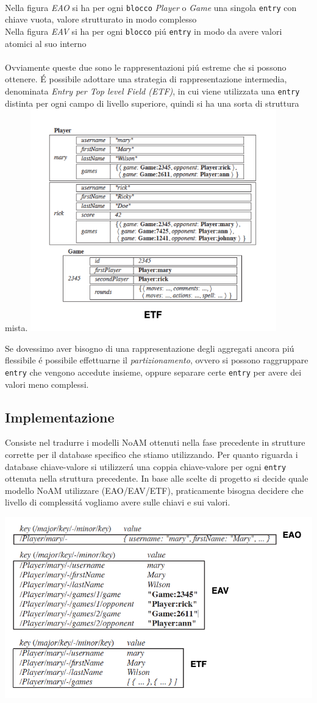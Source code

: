 \\
Nella figura \emph{EAO} si ha per ogni \texttt{blocco} \emph{Player} o \emph{Game} una singola \texttt{entry} con chiave vuota,
valore strutturato in modo complesso
\\
Nella figura \emph{EAV} si ha per ogni \texttt{blocco} piú \texttt{entry} in modo da avere valori atomici al suo interno
\\
\\
Ovviamente queste due sono le rappresentazioni piú estreme che si possono ottenere.
É possibile adottare una strategia di rappresentazione intermedia, denominata \emph{Entry per Top level Field (ETF)}, in cui
viene utilizzata una \texttt{entry} distinta per ogni campo di livello superiore, quindi si ha una sorta di struttura mista.
\includegraphics[width=0.8\textwidth]{img/etf}

Se dovessimo aver bisogno di una rappresentazione degli aggregati ancora piú flessibile é possibile effettuarne il \emph{partizionamento},
ovvero si possono raggruppare \texttt{entry} che vengono accedute insieme, oppure separare certe \texttt{entry} per avere dei
valori meno complessi.

\subsection{Implementazione}
Consiste nel tradurre i modelli NoAM ottenuti nella fase precedente in strutture corrette per il database specifico che stiamo utilizzando.
Per quanto riguarda i database chiave-valore si utilizzerá una coppia chiave-valore per ogni \texttt{entry} ottenuta nella struttura
precedente.
In base alle scelte di progetto si decide quale modello NoAM utilizzare (EAO/EAV/ETF), praticamente bisogna decidere che livello di
complessitá vogliamo avere sulle chiavi e sui valori.

\includegraphics[width=1\textwidth]{img/implementazione}


